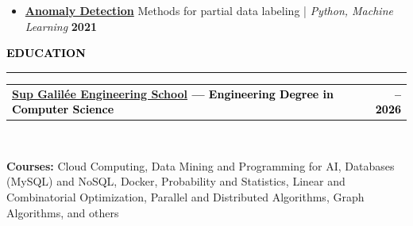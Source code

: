 \documentclass[10pt,english,french]{article}
\makeatletter
\newcommand{\educationIcon}[1][black]{\textcolor{#1}{\faGraduationCap}}
\newlength{\mpwidth}
\newcommand{\cvsection}[1]{
    \vspace{4pt}
    \textbf{\fontsize{9pt}{10pt}\selectfont \textcolor{black}{#1}}
    \vspace{6pt}
    \hrule
    \vspace{6pt}
}
\newcommand{\cvtextnotab}[1]{
    \parbox{1\mpwidth}{#1}
}
\newcommand{\cvevent}[2]{
    \vspace{2pt}
    \parbox{\mpwidth}{
        \begin{tabular*}{1\mpwidth}{@{\extracolsep{\fill}} l r}
            \textcolor{black}{\textbf{\fontsize{11}{12}\selectfont #1}} & \textcolor{black}{\textbf{\fontsize{12}{12}\selectfont #2}} \\
        \end{tabular*}\\[-8pt] %
    }
}
\newcommand{\cvsubevent}[2]{
    \parbox{\mpwidth}{
        \begin{tabular*}{1\mpwidth}{@{\extracolsep{\fill}} l r}
            \textcolor{black}{\textit{\fontsize{10}{12}\selectfont #1}} & \textcolor{black}{\textit{\fontsize{10}{12}\selectfont #2}} \\
        \end{tabular*}\\[-8pt] %
    }
    \vspace{-10pt}
}
\makeatother
\begin{document}
\begin{itemize}[leftmargin=0.5cm, label=\textbullet, itemsep=0.2em]
    \item \href{https://github.com/DmytroPalahin/Anomaly_Detection}{\textbf{Anomaly Detection}} Methods for partial data labeling | \textit{Python, Machine Learning} \hfill \textbf{2021}


\end{itemize}

\vspace{-5pt}
\cvsection{\educationIcon[black]\hspace{4pt}EDUCATION}

\vspace{-3pt}
\cvevent{\href{https://www.sup-galilee.univ-paris13.fr/}{Sup Galilée Engineering School} --- Engineering Degree in Computer Science}{\fontsize{11pt}{11pt}\selectfont 2023\hspace{5pt}--\hspace{5pt}2026}

\vspace{-3pt}
\cvtextnotab{\textbf{Courses\!:} Cloud Computing, Data Mining and Programming for AI, Databases (MySQL) and NoSQL, Docker, Probability and Statistics, Linear and Combinatorial Optimization, Parallel and Distributed Algorithms, Graph Algorithms, and others}

\vspace{-10pt}
\noindent{\textcolor{middle_light_gray}{\rule{\mpwidth}{0.2pt}}}
\vspace{-15pt}
\end{document}
